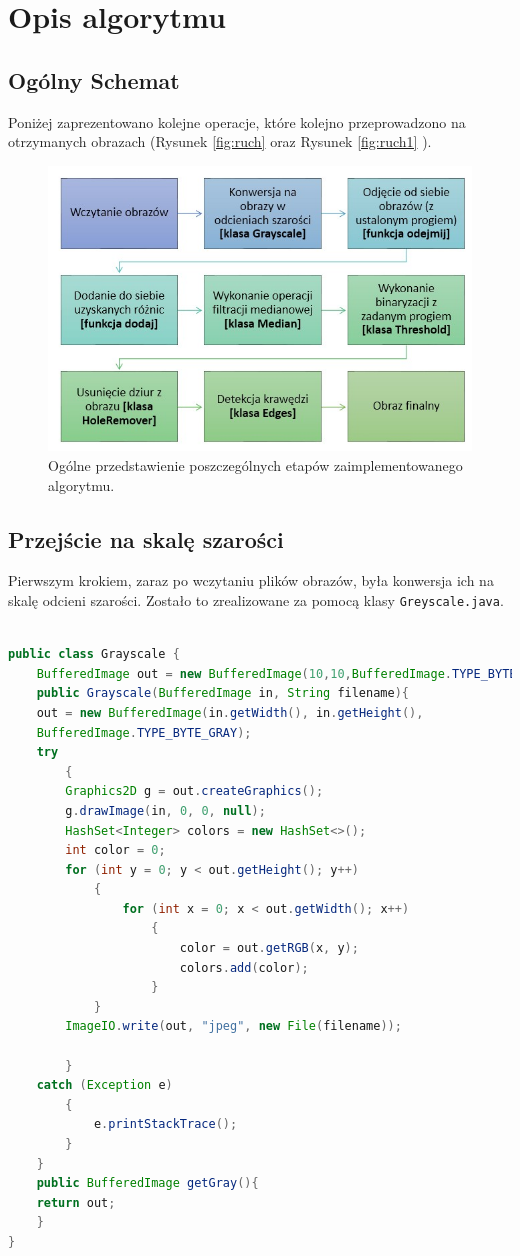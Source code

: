	\section{Opis algorytmu}
	\label{sec:algorytm}
	
	\subsection{Ogólny Schemat}
	
	Poniżej zaprezentowano kolejne operacje, które kolejno przeprowadzono na otrzymanych obrazach (Rysunek \ref{fig:ruch} oraz Rysunek \ref{fig:ruch1} ).
					\begin{figure}[h!]
						\centering
						\includegraphics[width=1\textwidth]{./img/532.jpg}
						\caption{\label{fig:schemat}Ogólne przedstawienie poszczególnych etapów zaimplementowanego algorytmu.}
					\end{figure}
					
	
	\subsection{Przejście na skalę szarości}
	Pierwszym krokiem, zaraz po wczytaniu plików obrazów, była konwersja ich na skalę odcieni szarości. Zostało to zrealizowane za pomocą klasy \texttt{Greyscale.java}.

	     	\begin{lstlisting}[language=Java]
	     	
public class Grayscale {
	BufferedImage out = new BufferedImage(10,10,BufferedImage.TYPE_BYTE_GRAY);
	public Grayscale(BufferedImage in, String filename){
	out = new BufferedImage(in.getWidth(), in.getHeight(),
	BufferedImage.TYPE_BYTE_GRAY);
	try
		{
		Graphics2D g = out.createGraphics();
		g.drawImage(in, 0, 0, null);
		HashSet<Integer> colors = new HashSet<>();
		int color = 0;
		for (int y = 0; y < out.getHeight(); y++)
			{
				for (int x = 0; x < out.getWidth(); x++)
					{
						color = out.getRGB(x, y);
						colors.add(color);
					}
			}
		ImageIO.write(out, "jpeg", new File(filename)); 

		}
	catch (Exception e)
		{
			e.printStackTrace();
		}
	}
	public BufferedImage getGray(){
	return out;
	}
}
	     	
	     	\end{lstlisting}
	     	


